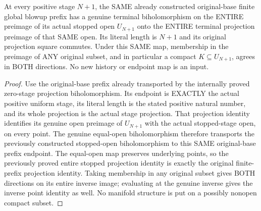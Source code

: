 \begin{theorem}
\label{hir:sharp-actual-curve-compact-finite-prefix-terminal-identification}
\leanok
At every positive stage $N+1$, the SAME already constructed original-base
finite global blowup prefix has a genuine terminal biholomorphism on the
ENTIRE preimage of its actual stopped open $U_{N+1}$ onto the ENTIRE
terminal projection preimage of that SAME open. Its literal length is
$N+1$ and its original projection square commutes. Under this SAME map,
membership in the preimage of ANY original subset, and in particular a
compact $K\subseteq U_{N+1}$, agrees in BOTH directions. No new history or
endpoint map is an input.
\end{theorem}
\begin{proof}
Use the original-base prefix already transported by the internally proved
zero-stage projection biholomorphism. Its endpoint is EXACTLY the actual
positive uniform stage, its literal length is the stated positive natural
number, and its whole projection is the actual stage projection. That
projection identity identifies its genuine open preimage of $U_{N+1}$
with the actual stopped-stage open, on every point. The genuine equal-open
biholomorphism therefore transports the previously constructed stopped-open
biholomorphism to this SAME original-base prefix endpoint. The equal-open
map preserves underlying points, so the previously proved entire stopped
projection identity is exactly the original finite-prefix projection
identity. Taking membership in any original subset gives BOTH directions
on its entire inverse image; evaluating at the genuine inverse gives the
inverse point identity as well. No manifold structure is put on a possibly
nonopen compact subset.
\end{proof}

